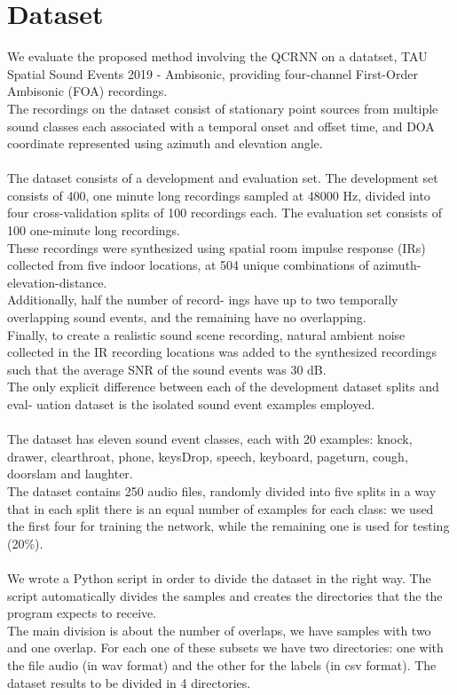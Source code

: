 \documentclass{article}
\begin{document}
    \section{Dataset}
    We evaluate the proposed method involving the QCRNN on a datatset, TAU Spatial Sound Events 2019 - Ambisonic, providing four-channel First-Order Ambisonic (FOA) recordings.\\
    The recordings on the dataset consist of stationary point sources from multiple sound classes each associated with a temporal onset and offset time, and DOA coordinate represented using azimuth and elevation angle.\\
    \\ The dataset consists of a development and evaluation set.  The development set consists of 400, one minute long recordings sampled at 48000 Hz, divided into four cross-validation splits of 100 recordings each. The evaluation set consists of 100 one-minute long recordings.\\
    These recordings were synthesized using spatial room impulse response (IRs) collected from five indoor locations, at 504 unique combinations of azimuth-elevation-distance. \\
    Additionally, half the number of record- ings have up to two temporally overlapping sound events, and the remaining have no overlapping.\\
    Finally, to create a realistic sound scene recording, natural ambient noise collected in the IR recording locations was added to the synthesized recordings such that the average SNR of the sound events was 30 dB.\\
    The only explicit difference between each of the development dataset splits and eval- uation dataset is the isolated sound event examples employed.\\
    \\ The dataset has eleven sound event classes, each with 20 examples: knock, drawer, clearthroat, phone, keysDrop,  speech, keyboard, pageturn, cough, doorslam and laughter.\\
    The dataset contains 250 audio files, randomly divided into five splits in a way that in each split there is an equal number of examples for each class: we used the first four for training the network, while the remaining one is used for testing (20\%).
    \\ \\ We wrote a Python script in order to divide the dataset in the right way. The script automatically divides the samples and creates the directories that the the program expects to receive.
    \\ The main division is about the number of overlaps, we have samples with two and one overlap. For each one of these subsets we have two directories: one with the file audio (in wav format) and the other for the labels (in csv format). The dataset results to be divided in 4 directories. 
\end{document}
